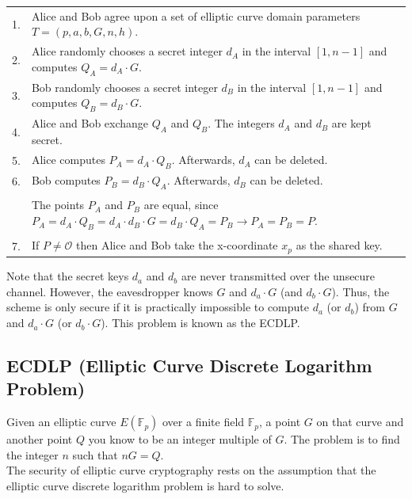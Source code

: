 \begin{tabular}{l p{15cm}}
	1.	&	Alice and Bob agree upon a set of elliptic curve domain parameters $T=(p,a,b,G,n,h)$. \\
	2.	&	Alice randomly chooses a secret integer $d_A$ in the interval $[1,n-1]$ and computes $Q_A=d_A \cdot G$.\\
	3.	&	Bob randomly chooses a secret integer $d_B$ in the interval $[1,n-1]$ and computes $Q_B=d_B \cdot G$.\\
	4.	&	Alice and Bob exchange $Q_A$ and $Q_B$. The integers $d_A$ and $d_B$ are kept secret.\\
	5.	&	Alice computes $P_A=d_A \cdot Q_B$. Afterwards, $d_A$ can be deleted. \\
	6.	&	Bob computes $P_B=d_B \cdot Q_A$. Afterwards, $d_B$ can be deleted. \\
		&	\\
		&	The points $P_A$ and $P_B$ are equal, since $P_A=d_A \cdot Q_B = d_A \cdot d_B \cdot G = d_B \cdot Q_A = P_B \to P_A = P_B = P$.\\
		&	\\
	7.	&	If $P \neq \mathcal{O}$ then Alice and Bob take the x-coordinate $x_p$ as the shared key.
\end{tabular}

Note that the secret keys $d_a$ and $d_b$ are never transmitted over the unsecure channel.
However, the eavesdropper knows $G$ and $d_a \cdot G$ (and $d_b \cdot G$).
Thus, the scheme is only secure if it is practically impossible to compute $d_a$ (or $d_b$) from $G$ and $d_a \cdot G$ (or $d_b \cdot G$).
This problem is known as the ECDLP.

\subsection{ECDLP (Elliptic Curve Discrete Logarithm Problem)}

Given an elliptic curve $E(\mathbb{F}_p)$ over a finite field $\mathbb{F}_p$, a point $G$ on that curve and another point $Q$ you know to be an integer multiple of $G$.
The problem is to find the integer $n$ such that $nG=Q$.\\
The security of elliptic curve cryptography rests on the assumption that the elliptic curve discrete logarithm problem is hard to solve.

